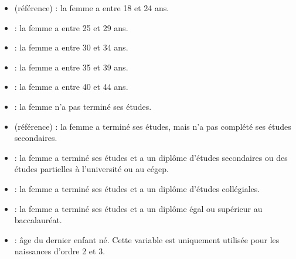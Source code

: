 \documentclass[letterpaper,10pt,french]{sphinxmanual}
\begin{document}
\begin{itemize}
\item {} 
 (référence) : la femme a entre 18 et 24 ans.

\item {} 
 : la femme a entre 25 et 29 ans.

\item {} 
 : la femme a entre 30 et 34 ans.

\item {} 
 : la femme a entre 35 et 39 ans.

\item {} 
 : la femme a entre 40 et 44 ans.

\end{itemize}

\begin{itemize}
\item {} 
 : la femme n’a pas terminé ses études.

\item {} 
 (référence) : la femme a terminé ses études, mais n’a pas complété ses études secondaires.

\item {} 
 : la femme a terminé ses études et a un diplôme d’études secondaires ou des études partielles à l’université ou au cégep.

\item {} 
 : la femme a terminé ses études et a un diplôme d’études collégiales.

\item {} 
 : la femme a terminé ses études et a un diplôme égal ou supérieur au baccalauréat.

\end{itemize}

\begin{itemize}
\item {} 
 : âge du dernier enfant né. Cette variable est uniquement utilisée pour les naissances d’ordre 2 et 3.

\end{itemize}
\end{document}
